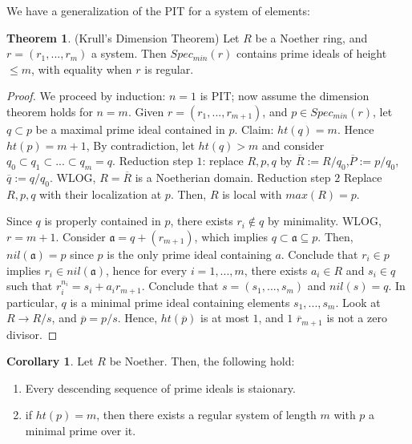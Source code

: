 \documentclass{article}
\theoremstyle{definition}
\newtheorem{theorem}{Theorem}[section]
\theoremstyle{definition}
\theoremstyle{definition}
\theoremstyle{definition}
\theoremstyle{definition}
\theoremstyle{definition}
\newtheorem{corollary}{Corollary}[theorem]
\theoremstyle{definition}
\begin{document}
We have a generalization of the PIT for a system of elements:
\begin{tcolorbox}[colback=red!5!white,colframe=red!30!white]
\begin{theorem}
(Krull's Dimension Theorem) Let $R$ be a Noether ring, and $r=(r_1,...,r_m)$ a system. Then $Spec_{min}(r)$ contains prime ideals of height $\leq m$, with equality when $r$ is regular.
\end{theorem}
\end{tcolorbox}
\begin{proof}


    We proceed by induction: $n=1$ is PIT; now assume the dimension theorem holds for $n=m$. Given $r=(r_1,...,r_{m+1})$, and $p\in Spec_{min}(r)$, let $q\subset p$ be a maximal prime ideal contained in $p$. Claim: $ht(q)=m$. Hence $ht(p)=m+1$,
   By contradiction, let $ht(q)>m$ and consider $q_0\subset q_1\subset ...\subset q_m=q$. Reduction step $1$: replace $R,p,q$ by $\overline{R}:=R/q_0$,$\overline{P}:=p/q_0$, $\overline{q}:=q/q_0$. WLOG, $R=\overline{R}$ is a Noetherian domain. Reduction step $2$ Replace $R,p,q$ with their localization at $p$. Then, $R$ is local with $max(R)=p$.
    
    Since $q$ is properly contained in $p$, there exists $r_i\not\in q$ by minimality. WLOG, $r=m+1$. Consider $\mathfrak{a}=q+(r_{m+1})$, which implies $q\subset \mathfrak{a}\subseteq p$. Then, $nil(\mathfrak{a})=p$ since $p$ is the only prime ideal containing $a$. Conclude that $r_i\in p$ implies $r_i\in nil(\mathfrak{a})$, hence for every $i=1,...,m$, there exists $a_i\in R$ and $s_i\in q$ such that $r_i^{n_i}=s_i+a_ir_{m+1}$. Conclude that $s=(s_1,...,s_m)$ and $nil(s)=q$. In particular, $q$ is a minimal prime ideal containing elements $s_1,...,s_m$. Look at $R\to R/s$, and $\overline{p}=p/s$. Hence, $ht(\overline{p})$ is at most $1$, and $1$ $\overline{r}_{m+1}$ is not a zero divisor. 
    
\end{proof}


\begin{tcolorbox}[colback=green!5!white,colframe=green!30!white]
\begin{corollary}
Let $R$ be Noether. Then, the following hold:
\begin{enumerate}
    \item Every descending sequence of prime ideals is staionary. 
    \item if $ht(p)=m$, then there exists a regular system of length $m$ with $p$ a minimal prime over it.
\end{enumerate}
\end{corollary}
\end{tcolorbox}
\end{document}

